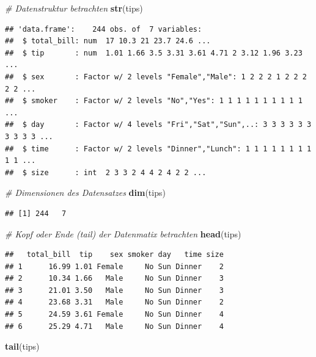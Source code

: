 \documentclass[10pt,ngerman,onside]{article}
\newenvironment{Shaded}{\begin{snugshade}}{\end{snugshade}}
\newcommand{\KeywordTok}[1]{\textcolor[rgb]{0.13,0.29,0.53}{\textbf{#1}}}
\newcommand{\CommentTok}[1]{\textcolor[rgb]{0.56,0.35,0.01}{\textit{#1}}}
\newcommand{\NormalTok}[1]{#1}
\begin{document}
\begin{Shaded}
\begin{Highlighting}[]
\CommentTok{# Datenstruktur betrachten}
\KeywordTok{str}\NormalTok{(tips)}
\end{Highlighting}
\end{Shaded}

\begin{verbatim}
## 'data.frame':    244 obs. of  7 variables:
##  $ total_bill: num  17 10.3 21 23.7 24.6 ...
##  $ tip       : num  1.01 1.66 3.5 3.31 3.61 4.71 2 3.12 1.96 3.23 ...
##  $ sex       : Factor w/ 2 levels "Female","Male": 1 2 2 2 1 2 2 2 2 2 ...
##  $ smoker    : Factor w/ 2 levels "No","Yes": 1 1 1 1 1 1 1 1 1 1 ...
##  $ day       : Factor w/ 4 levels "Fri","Sat","Sun",..: 3 3 3 3 3 3 3 3 3 3 ...
##  $ time      : Factor w/ 2 levels "Dinner","Lunch": 1 1 1 1 1 1 1 1 1 1 ...
##  $ size      : int  2 3 3 2 4 4 2 4 2 2 ...
\end{verbatim}

\begin{Shaded}
\begin{Highlighting}[]
\CommentTok{# Dimensionen des Datensatzes}
\KeywordTok{dim}\NormalTok{(tips)}
\end{Highlighting}
\end{Shaded}

\begin{verbatim}
## [1] 244   7
\end{verbatim}

\begin{Shaded}
\begin{Highlighting}[]
\CommentTok{# Kopf oder Ende (tail) der Datenmatix betrachten}
\KeywordTok{head}\NormalTok{(tips)}
\end{Highlighting}
\end{Shaded}

\begin{verbatim}
##   total_bill  tip    sex smoker day   time size
## 1      16.99 1.01 Female     No Sun Dinner    2
## 2      10.34 1.66   Male     No Sun Dinner    3
## 3      21.01 3.50   Male     No Sun Dinner    3
## 4      23.68 3.31   Male     No Sun Dinner    2
## 5      24.59 3.61 Female     No Sun Dinner    4
## 6      25.29 4.71   Male     No Sun Dinner    4
\end{verbatim}

\begin{Shaded}
\begin{Highlighting}[]
\KeywordTok{tail}\NormalTok{(tips)}
\end{Highlighting}
\end{Shaded}
\end{document}
